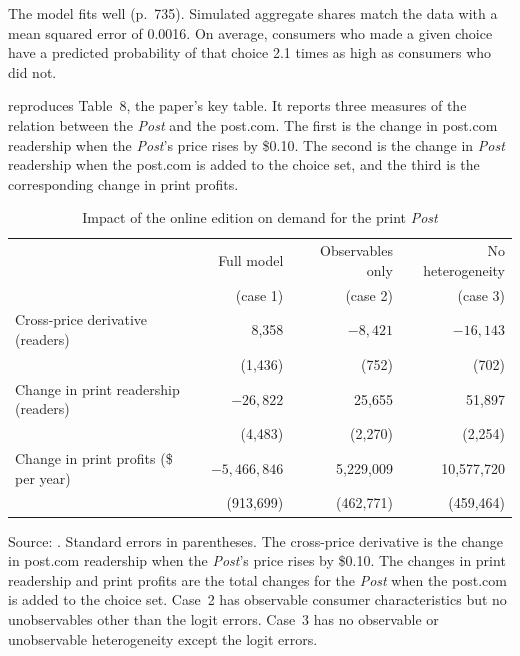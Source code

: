 The model fits well (p.~735). Simulated aggregate shares match the data with a mean squared error of 0.0016. On average,
consumers who made a given choice have a predicted probability of that choice 2.1 times as high as consumers who did
not.

  reproduces Table~8, the paper's key table. It reports
three measures of the relation between the \textit{Post} and the post.com. The first is the change in post.com
readership when the \textit{Post}'s price rises by \$0.10. The second is the change in \textit{Post} readership when the
post.com is added to the choice set, and the third is the corresponding change in print profits.

\begin{table}[htbp]
\centering
\caption{Impact of the online edition on demand for the print \textit{Post}}\label{tab:10-gentzkow-subst}
\small
\begin{tabular}{@{}lrrr@{}}
\toprule
 & Full model & Observables only & No heterogeneity \\
 & (case 1) & (case 2) & (case 3) \\
\midrule
Cross-price derivative (readers)        & 8,358        & $-8{,}421$      & $-16{,}143$ \\
                                        & (1,436)      & (752)         & (702) \\
Change in print readership (readers)    & $-26{,}822$    & 25,655        & 51,897 \\
                                        & (4,483)      & (2,270)       & (2,254) \\
Change in print profits (\$ per year)   & $-5{,}466{,}846$ & 5,229,009     & 10,577,720 \\
                                        & (913,699)    & (462,771)     & (459,464) \\
\bottomrule
\end{tabular}

\smallskip
\begin{minipage}{0.92\textwidth}
\footnotesize Source: \citet[Table~8]{Gentzkow2007}. Standard errors in parentheses. The cross-price derivative is the
change in post.com readership when the \textit{Post}'s price rises by \$0.10. The changes in print readership and
print profits are the total changes for the \textit{Post} when the post.com is added to the choice set. Case~2 has
observable consumer characteristics but no unobservables other than the logit errors. Case~3 has no observable or
unobservable heterogeneity except the logit errors.
\end{minipage}
\end{table}

